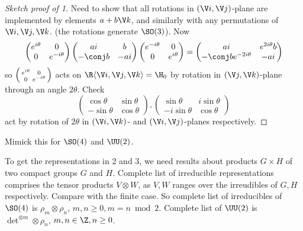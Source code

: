\documentclass[a4paper]{article}
\theoremstyle{definition}
\begin{document}
\begin{proof}[Sketch proof of  1]
  Need to show that all rotations in \((\V i, \V j)\)-plane are implemented by elements \(a + b \V k\), and similarly with any permutations of \(\V i, \V j, \V k\). (the rotations generate \(\SO(3)\)). Now
  \[
    \begin{pmatrix}
      e^{i\theta} & 0 \\
      0 & e^{-i\theta}
    \end{pmatrix}
    \begin{pmatrix}
      ai & b \\
      - \conj b & -ai
    \end{pmatrix}
    \begin{pmatrix}
      e^{-i\theta} & 0 \\
      0 & e^{i\theta}
    \end{pmatrix}
    =
    \begin{pmatrix}
      ai & e^{2i\theta} b \\
      -\conj b e^{-2i\theta} & -ai
    \end{pmatrix}
  \]
  so \(
  \begin{psmallmatrix}
    e^{i\theta} & 0 \\
    0 & e^{-i\theta}
  \end{psmallmatrix}
  \) acts on \(\R \langle \V i, \V j, \V k \rangle = \H_0\) by rotation in \((\V j, \V k)\)-plane through an angle \(2\theta\). Check
  \[
    \begin{pmatrix}
      \cos \theta & \sin \theta \\
      -\sin \theta & \cos \theta
    \end{pmatrix},
    \begin{pmatrix}
      \sin \theta & i \sin \theta \\
      - i \sin \theta & \cos \theta
    \end{pmatrix}
  \]
  act by rotation of \(2 \theta \) in \((\V i, \V k)\)- and \((\V i, \V j)\)-planes respectively.
\end{proof}

\begin{ex}
  Mimick this for \(\SO(4)\) and \(\UU(2)\).
\end{ex}
To get the representations in 2 and 3, we need results about products \(G \times H\) of two compact groups \(G\) and \(H\).  Complete list of irreducible representations comprises the tensor products \(V \otimes W\), as \(V, W\) ranges over the irreudibles of \(G, H\) respectively. Compare with the finite case. So complete list of irreducibles of \(\SO(4)\) is \(\rho_m \otimes \rho_n\), \(m, n \geq 0 , m = n \bmod 2\). Complete list of \(\UU(2)\) is \(\det^{\otimes m} \otimes \rho_n\), \(m, n \in \Z, n \geq 0\).





  




\printindex
\end{document}
